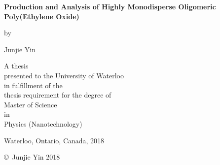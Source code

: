 
\pagestyle{empty}

\begin{titlepage}
        \begin{center}
        \vspace*{1.0cm}

        \Huge
        {\bf Production and Analysis of Highly Monodisperse Oligomeric Poly(Ethylene Oxide) }

        \vspace*{1.0cm}

        \normalsize
        by \\

        \vspace*{1.0cm}

        \Large
        Junjie Yin \\

        \vspace*{3.0cm}

        \normalsize
        A thesis \\
        presented to the University of Waterloo \\ 
        in fulfillment of the \\
        thesis requirement for the degree of \\
        Master of Science \\
        in \\
        Physics (Nanotechnology)\\

        \vspace*{2.0cm}

        Waterloo, Ontario, Canada, 2018 \\

        \vspace*{1.0cm}

        \copyright\ Junjie Yin 2018 \\
        \end{center}
\end{titlepage}

\pagestyle{plain}
\setcounter{page}{2}

\cleardoublepage %
 

